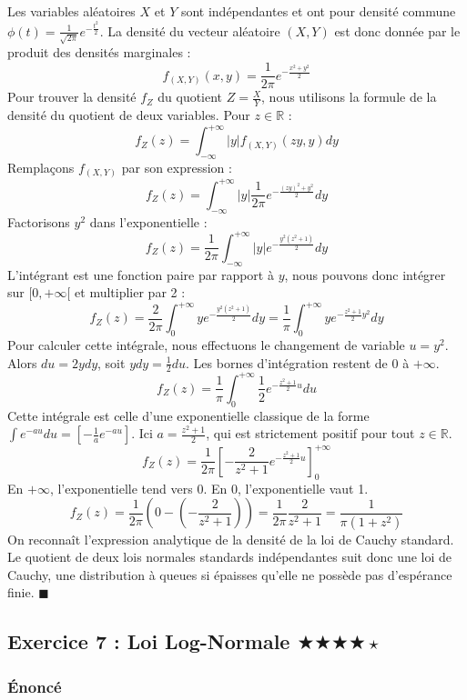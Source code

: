 \documentclass[11pt,a4paper]{article}
\begin{document}
Les variables aléatoires $X$ et $Y$ sont indépendantes et ont pour densité commune $\phi(t) = \frac{1}{\sqrt{2\pi}} e^{-\frac{t^2}{2}}$.
La densité du vecteur aléatoire $(X, Y)$ est donc donnée par le produit des densités marginales :
$$ f_{(X,Y)}(x, y) = \frac{1}{2\pi} e^{-\frac{x^2 + y^2}{2}} $$
Pour trouver la densité $f_Z$ du quotient $Z = \frac{X}{Y}$, nous utilisons la formule de la densité du quotient de deux variables. Pour $z \in \mathbb{R}$ :
$$ f_Z(z) = \int_{-\infty}^{+\infty} |y| f_{(X,Y)}(zy, y) dy $$
Remplaçons $f_{(X,Y)}$ par son expression :
$$ f_Z(z) = \int_{-\infty}^{+\infty} |y| \frac{1}{2\pi} e^{-\frac{(zy)^2 + y^2}{2}} dy $$
Factorisons $y^2$ dans l'exponentielle :
$$ f_Z(z) = \frac{1}{2\pi} \int_{-\infty}^{+\infty} |y| e^{-\frac{y^2(z^2 + 1)}{2}} dy $$
L'intégrant est une fonction paire par rapport à $y$, nous pouvons donc intégrer sur $[0, +\infty[$ et multiplier par 2 :
$$ f_Z(z) = \frac{2}{2\pi} \int_{0}^{+\infty} y e^{-\frac{y^2(z^2 + 1)}{2}} dy = \frac{1}{\pi} \int_{0}^{+\infty} y e^{-\frac{z^2 + 1}{2} y^2} dy $$
Pour calculer cette intégrale, nous effectuons le changement de variable $u = y^2$.
Alors $du = 2y dy$, soit $y dy = \frac{1}{2} du$. Les bornes d'intégration restent de $0$ à $+\infty$.
$$ f_Z(z) = \frac{1}{\pi} \int_{0}^{+\infty} \frac{1}{2} e^{-\frac{z^2 + 1}{2} u} du $$
Cette intégrale est celle d'une exponentielle classique de la forme $\int e^{-a u} du = \left[ -\frac{1}{a} e^{-a u} \right]$.
Ici $a = \frac{z^2 + 1}{2}$, qui est strictement positif pour tout $z \in \mathbb{R}$.
$$ f_Z(z) = \frac{1}{2\pi} \left[ -\frac{2}{z^2 + 1} e^{-\frac{z^2 + 1}{2} u} \right]_0^{+\infty} $$
En $+\infty$, l'exponentielle tend vers 0. En 0, l'exponentielle vaut 1.
$$ f_Z(z) = \frac{1}{2\pi} \left( 0 - \left( -\frac{2}{z^2 + 1} \right) \right) = \frac{1}{2\pi} \frac{2}{z^2 + 1} = \frac{1}{\pi(1 + z^2)} $$
On reconnaît l'expression analytique de la densité de la loi de Cauchy standard.
Le quotient de deux lois normales standards indépendantes suit donc une loi de Cauchy, une distribution à queues si épaisses qu'elle ne possède pas d'espérance finie. $\blacksquare$


\subsection*{Exercice 7 : Loi Log-Normale \quad $\bigstar\bigstar\bigstar\bigstar\star$}

\subsubsection*{Énoncé}
\end{document}
